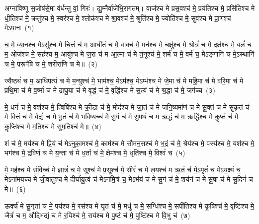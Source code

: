 
{\anuvakamend[{घा॒सिं कश॑या तपद्र॒यिं नव॑ च}]}%

\setcounter{anuvakam}{0}
अग्ना॑विष्णू स॒जोष॑से॒मा व॑र्धन्तु वां॒ गिरः॑। द्यु॒म्नैर्वाजे॑भि॒राग॑तम्। वाज॑श्च मे प्रस॒वश्च॑ मे॒ प्रय॑तिश्च मे॒ प्रसि॑तिश्च मे धी॒तिश्च॑ मे॒ क्रतु॑श्च मे॒ स्वर॑श्च मे॒ श्लोक॑श्च मे श्रा॒वश्च॑ मे॒ श्रुति॑श्च मे॒ ज्योति॑श्च मे॒ सुव॑श्च मे प्रा॒णश्च॑ मे\-ऽपा॒नः~(१)

च॒ मे॒ व्या॒नश्च॒ मे\-ऽसु॑श्च मे चि॒त्तं च॑ म॒ आधी॑तं च मे॒ वाक्च॑ मे॒ मन॑श्च मे॒ चक्षु॑श्च मे॒ श्रोत्रं॑ च मे॒ दक्ष॑श्च मे॒ बलं॑ च म॒ ओज॑श्च मे॒ सह॑श्च म॒ आयु॑श्च मे ज॒रा च॑ म आ॒त्मा च॑ मे त॒नूश्च॑ मे॒ शर्म॑ च मे॒ वर्म॑ च॒ मे\-ऽङ्गा॑नि च मे॒\-ऽस्थानि॑ च मे॒ परूꣳ॑षि च मे॒ शरी॑राणि च मे॥~(२)

{\anuvakamend[{अ॒पा॒नस्त॒नूश्च॑ मे॒\-ऽष्टाद॑श च}]}%

ज्यैष्ठ्यं॑ च म॒ आधि॑पत्यं च मे म॒न्युश्च॑ मे॒ भाम॑श्च॒ मे\-ऽम॑श्च॒ मे\-ऽम्भ॑श्च मे जे॒मा च॑ मे महि॒मा च॑ मे वरि॒मा च॑ मे प्रथि॒मा च॑ मे व॒र्ष्मा च॑ मे द्राघु॒या च॑ मे वृ॒द्धं च॑ मे॒ वृद्धि॑श्च मे स॒त्यं च॑ मे श्र॒द्धा च॑ मे॒ जग॑च्च~(३)

मे॒ धनं॑ च मे॒ वश॑श्च मे॒ त्विषि॑श्च मे क्री॒डा च॑ मे॒ मोद॑श्च मे जा॒तं च॑ मे जनि॒ष्यमा॑णं च मे सू॒क्तं च॑ मे सुकृ॒तं च॑ मे वि॒त्तं च॑ मे॒ वेद्यं॑ च मे भू॒तं च॑ मे भवि॒ष्यच्च॑ मे सु॒गं च॑ मे सु॒पथं॑ च म ऋ॒द्धं च॑ म॒ ऋद्धि॑श्च मे कॢ॒प्तं च॑ मे॒ कॢप्ति॑श्च मे म॒तिश्च॑ मे सुम॒तिश्च॑ मे॥~(४)

{\anuvakamend[{जग॒च्चर्द्धि॒श्चतु॑र्दश च}]}%

शं च॑ मे॒ मय॑श्च मे प्रि॒यं च॑ मे\-ऽनुका॒मश्च॑ मे॒ काम॑श्च मे सौमन॒सश्च॑ मे भ॒द्रं च॑ मे॒ श्रेय॑श्च मे॒ वस्य॑श्च मे॒ यश॑श्च मे॒ भग॑श्च मे॒ द्रवि॑णं च मे य॒न्ता च॑ मे ध॒र्ता च॑ मे॒ क्षेम॑श्च मे॒ धृति॑श्च मे॒ विश्वं॑ च~(५)

मे॒ मह॑श्च मे सं॒विच्च॑ मे॒ ज्ञात्रं॑ च मे॒ सूश्च॑ मे प्र॒सूश्च॑ मे॒ सीरं॑ च मे ल॒यश्च॑ म ऋ॒तं च॑ मे॒\-ऽमृतं॑ च मे\-ऽय॒क्ष्मं च॒ मे\-ऽना॑मयच्च मे जी॒वातु॑श्च मे दीर्घायु॒त्वं च॑ मे\-ऽनमि॒त्रं च॒ मे\-ऽभ॑यं च मे सु॒गं च॑ मे॒ शय॑नं च मे सू॒षा च॑ मे सु॒दिनं॑ च मे॥~(६)

{\anuvakamend[{विश्वं॑ च॒ शय॑नम॒ष्टौ च॑}]}%

ऊर्क्च॑ मे सू॒नृता॑ च मे॒ पय॑श्च मे॒ रस॑श्च मे घृ॒तं च॑ मे॒ मधु॑ च मे॒ सग्धि॑श्च मे॒ सपी॑तिश्च मे कृ॒षिश्च॑ मे॒ वृष्टि॑श्च मे॒ जैत्रं॑ च म॒ औद्भि॑द्यं च मे र॒यिश्च॑ मे॒ राय॑श्च मे पु॒ष्टं च॑ मे॒ पुष्टि॑श्च मे वि॒भु च॑~(७)

